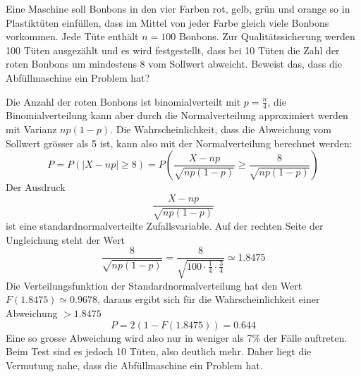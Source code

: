 Eine Maschine soll Bonbons in den vier Farben rot, gelb, grün
und orange so in
Plastiktüten einfüllen, dass im Mittel von jeder Farbe gleich
viele Bonbons vorkommen. Jede Tüte enthält $n=100$ Bonbons.
Zur Qualitätssicherung werden 100 Tüten ausgezählt und
es wird festgestellt, dass bei 10 Tüten die Zahl der roten
Bonbons um mindestens 8 vom Sollwert abweicht. Beweist das,
dass die Abfüllmaschine ein Problem hat?

\begin{loesung}
Die Anzahl der roten Bonbons ist binomialverteilt mit $p=\frac{n}4$,
die Binomialverteilung
kann aber durch die Normalverteilung approximiert werden mit
Varianz $np(1-p)$. Die Wahrscheinlichkeit, dass die Abweichung vom
Sollwert grösser als 5 ist, kann also mit der Normalverteilung
berechnet werden:
\[
P = P\left(\left|X-np\right|\ge 8\right)
=P\left(
\frac{X-np}{\sqrt{np(1-p)}}\ge \frac{8}{\sqrt{np(1-p)}}
\right)
\]
Der Ausdruck
\[
\frac{X-np}{\sqrt{np(1-p)}}
\]
ist eine standardnormalverteilte Zufallsvariable. Auf der
rechten Seite der Ungleichung steht der Wert
\[
\frac{8}{\sqrt{np(1-p)}}
=\frac{8}{\sqrt{100\cdot\frac14\cdot\frac34}}\simeq 1.8475
\]
Die Verteilungsfunktion der Standardnormalverteilung hat den
Wert $F(1.8475)\simeq0.9678$, daraus ergibt sich für die
Wahrscheinlichkeit einer Abweichung $>1.8475$
\[
P=2(1-F(1.8475))=0.644
\]
Eine so grosse Abweichung wird also nur in weniger als 7\%
der Fälle auftreten. Beim Test sind es jedoch 10 Tüten,
also deutlich mehr. Daher liegt die Vermutung nahe, dass
die Abfüllmaschine ein Problem hat.
\end{loesung}

